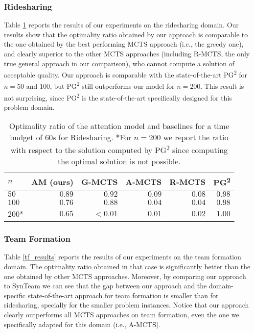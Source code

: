 \documentclass{article}
\theoremstyle{definition}
\begin{document}
\subsubsection{Ridesharing}

Table \ref{rs_results} reports the results of our experiments on the ridesharing domain. Our results show that the optimality ratio obtained by our approach is comparable to the one obtained by the best performing MCTS approach (i.e., the greedy one), and clearly superior to the other MCTS approaches (including R-MCTS, the only true general approach in our comparison), who cannot compute a solution of acceptable quality. Our approach is comparable with the state-of-the-art PG\textsuperscript{2} for $n=50$ and $100$, but PG\textsuperscript{2} still outperforms our model for $n=200$. This result is not surprising, since PG\textsuperscript{2} is the state-of-the-art specifically designed for this problem domain.

\setlength\tabcolsep{5pt}
\begin{table}[]
\centering
\begin{tabular}{@{}lrrrrr@{}}
\toprule
$n$ & AM (ours) & G-MCTS & A-MCTS & R-MCTS & PG\textsuperscript{2} \\ \midrule
$50$ & $0.89$ & $0.92$ & $0.09$ & $0.08$ & $0.98$ \\
$100$ & $0.76$ & $0.88$ & $0.04$ & $0.04$ & $0.98$\\
$200$* & $0.65$ & $<0.01$ & $0.01$ & $0.02$ & $1.00$\\ \bottomrule
\end{tabular}
\caption{Optimality ratio of the attention model and baselines for a time budget of 60s for Ridesharing.
*For $n = 200$ we report the ratio with respect to the solution computed by PG\textsuperscript{2} since computing the optimal solution is not possible.}
\label{rs_results}
\end{table}

\subsubsection{Team Formation}

Table \ref{tf_results} reports the results of our experiments on the team formation domain. The optimality ratio obtained in that case is significantly better than the one obtained by other MCTS approaches. Moreover, by comparing our approach to SynTeam we can see that the gap between our approach and the domain-specific state-of-the-art approach for team formation is smaller than for ridesharing, specially for the smaller problem instances.
Notice that our approach clearly outperforms all MCTS approaches on team formation, even the one we specifically adapted for this domain (i.e., A-MCTS).
\end{document}
